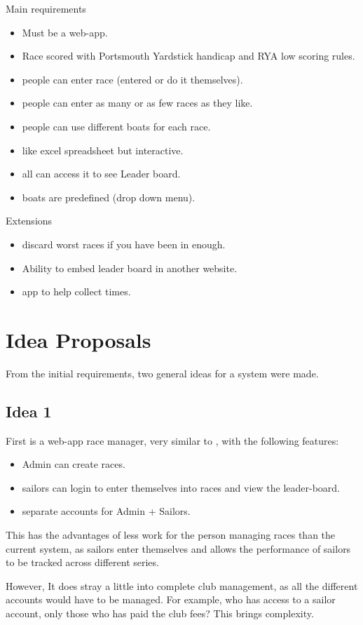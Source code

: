 \documentclass{l4proj}
\begin{document}
Main requirements
\begin{itemize}
    \item
    Must be a web-app.
    \item
    Race scored with Portsmouth Yardstick handicap and RYA low scoring rules.
    \item
    people can enter race (entered or do it themselves).
    \item
    people can enter as many or as few races as they like.
    \item
    people can use different boats for each race.
    \item
    like excel spreadsheet but interactive.
    \item
    all can access it to see Leader board.
    \item
    boats are predefined (drop down menu).
\end{itemize}
Extensions
\begin{itemize}
    \item
    discard worst races if you have been in enough.
    \item
    Ability to embed leader board in another website.
    \item
    app to help collect times.
\end{itemize}

\section{Idea Proposals}
From the initial requirements, two general ideas for a system were made.
\subsection{Idea 1}
First is a web-app race manager, very similar to \citep{SailEvent}, with the following features:
\begin{itemize}
    \item
    Admin can create races.
    \item
    sailors can login to enter themselves into races and view the leader-board.
    \item
    separate accounts for Admin + Sailors.
\end{itemize}

This has the advantages of less work for the person managing races than the current system, as sailors enter themselves and allows the performance of sailors to be tracked across different series.

However, It does stray a little into complete club management, as all the different accounts would have to be managed. For example, who has access to a sailor account, only those who has paid the club fees? This brings complexity.
\end{document}
